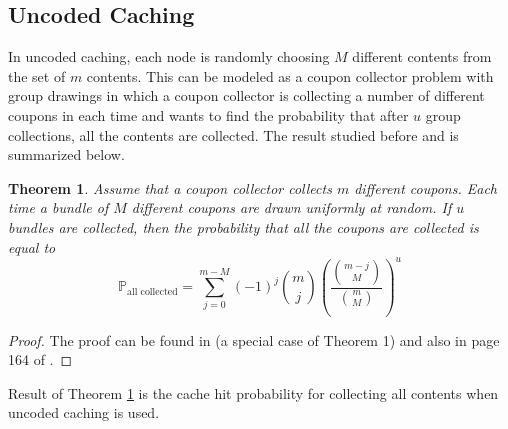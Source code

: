 \documentclass[10pt,journal]{IEEEtran}
\newtheorem{thm}{Theorem}
\begin{document}
{\subsection{Uncoded Caching}
In uncoded caching, each node is randomly choosing $M$ different contents from the set of $m$ contents. This can be modeled as a {coupon collector problem with group drawings} in which a coupon collector is collecting a number of different coupons in each time and wants to find the probability that after $u$ group collections, all the contents are collected. The result studied before \cite{stadje1990collector, johnson1977urn} and is summarized below. 
\begin{thm}{\em
 Assume that a coupon collector collects $m$ different coupons. Each time a bundle of $M$ different coupons are drawn uniformly at random. If $u$ bundles are collected, then the probability that all the coupons are collected is equal to 
 \begin{equation}
  \mathbb{P}_{\textrm{all collected}} = \sum_{j=0}^{m-M}(-1)^j \binom{m}{j} \left( \frac{\binom{m-j}{M}}{\binom{m}{M}} \right)^u
  \label{eqs_group_coupon}
 \end{equation}

 }\label{thm_urn}
\end{thm}
\begin{proof}
 The proof can be found in \cite{stadje1990collector} (a special case of Theorem 1) and also in page 164 of \cite{johnson1977urn}.
\end{proof}
Result of Theorem \ref{thm_urn} is the cache hit probability for collecting all contents when uncoded caching is used. 
}
\end{document}
